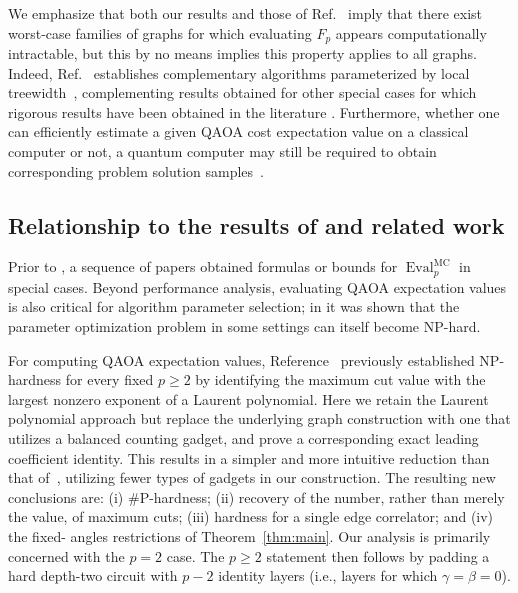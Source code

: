 \documentclass[11pt]{article}
\newcommand{\Eval}{\operatorname{Eval}}
\newcommand{\sh}[1]{{#1}}
\begin{document}
We emphasize that both our results and those of Ref.~\cite{WangEtAl2025} imply that there exist \sh{worst-case} families of graphs for which evaluating $F_p$ appears computationally intractable, but this by no means implies this property applies to all graphs. %
Indeed, Ref.~\cite{WangEtAl2025} establishes complementary 
algorithms parameterized by local treewidth~\cite{WangEtAl2025}, complementing 
results obtained for other special cases %
for which %
rigorous results have been obtained
in the literature \cite{Farhi2014,Farhi2014b,Wang2018,hadfield2018quantum,jiang2017near,bravyi2020obstacles,hastings2019classical,marwaha2021local,wurtz2021maxcut,barak2021classical,marwaha2022bounds,hadfield2022analytical,ozaeta2022expectation,basso2021quantum,boulebnane2021predicting,farhi2022quantum,basso2022performance,boulebnane2025evidence}. 
Furthermore, whether one can efficiently estimate a given QAOA cost expectation value on a classical computer or not, a quantum computer %
may still be required to obtain corresponding problem solution samples~\cite{farhi2016quantum}. 






\subsection{Relationship to the results of \cite{WangEtAl2025} and related work}

Prior to \cite{WangEtAl2025}, a sequence of papers \cite{Farhi2014,Farhi2014b,Wang2018,hadfield2018quantum,jiang2017near,bravyi2020obstacles,hastings2019classical,marwaha2021local,wurtz2021maxcut,marwaha2022bounds,ozaeta2022expectation,hadfield2022analytical,basso2021quantum,boulebnane2021predicting,farhi2022quantum,basso2022performance,boulebnane2025evidence} obtained formulas or bounds for $\Eval_p^{\mathrm{MC}}$ in special cases. 
Beyond performance analysis, evaluating QAOA expectation values is also critical for algorithm parameter selection; in \cite{bittel2021training} it was shown that the %
parameter optimization problem in some settings can itself become NP-hard. 


For computing QAOA expectation values, Reference~\cite{WangEtAl2025} previously established
NP-hardness for every fixed $p\geq2$ by identifying the maximum cut value with the largest nonzero exponent
of a Laurent polynomial.  
Here we retain the Laurent %
polynomial approach
but replace the
underlying graph construction with one that utilizes a balanced counting gadget, and prove a corresponding exact leading  coefficient identity.  
This results in a simpler and more intuitive %
reduction than that of~\cite{WangEtAl2025}, utilizing fewer types of gadgets in our construction. 
The resulting new conclusions are: (i) $\#$P-hardness;
(ii) recovery of the number, rather than merely the value, of maximum cuts; (iii) hardness
for a single edge correlator; and (iv) the fixed-%
angles restrictions of Theorem~\ref{thm:main}. Our analysis is primarily concerned with the $p=2$ case. The %
$p\geq 2$ statement then follows by padding a
hard depth-two circuit with $p-2$ identity layers (i.e., layers for which $\gamma=\beta=0$).
\end{document}
